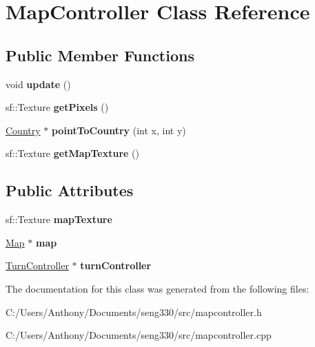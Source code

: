 \hypertarget{class_map_controller}{}\section{Map\+Controller Class Reference}
\label{class_map_controller}
\subsection*{Public Member Functions}
\begin{DoxyCompactItemize}
\item 
\hypertarget{class_map_controller_adced4bd3ec77f9b9be0dfe4d4f808780}{}void {\bfseries update} ()\label{class_map_controller_adced4bd3ec77f9b9be0dfe4d4f808780}

\item 
\hypertarget{class_map_controller_abb8a01b6107a60b4a7f6a37ac742b476}{}sf\+::\+Texture {\bfseries get\+Pixels} ()\label{class_map_controller_abb8a01b6107a60b4a7f6a37ac742b476}

\item 
\hypertarget{class_map_controller_a41e66a786f72c143fb707a9443f7d94e}{}\hyperlink{class_country}{Country} $\ast$ {\bfseries point\+To\+Country} (int x, int y)\label{class_map_controller_a41e66a786f72c143fb707a9443f7d94e}

\item 
\hypertarget{class_map_controller_a78ac4d045098a856b48d61e8e939e5aa}{}sf\+::\+Texture {\bfseries get\+Map\+Texture} ()\label{class_map_controller_a78ac4d045098a856b48d61e8e939e5aa}

\end{DoxyCompactItemize}
\subsection*{Public Attributes}
\begin{DoxyCompactItemize}
\item 
\hypertarget{class_map_controller_a1ae9ff76511baabf2d5c61133b6d5246}{}sf\+::\+Texture {\bfseries map\+Texture}\label{class_map_controller_a1ae9ff76511baabf2d5c61133b6d5246}

\item 
\hypertarget{class_map_controller_a136fc0bac51b7171f3e31505c6b90a34}{}\hyperlink{class_map}{Map} $\ast$ {\bfseries map}\label{class_map_controller_a136fc0bac51b7171f3e31505c6b90a34}

\item 
\hypertarget{class_map_controller_ac32c7f2abafb9c002cf746cf761afc56}{}\hyperlink{class_turn_controller}{Turn\+Controller} $\ast$ {\bfseries turn\+Controller}\label{class_map_controller_ac32c7f2abafb9c002cf746cf761afc56}

\end{DoxyCompactItemize}


The documentation for this class was generated from the following files\+:\begin{DoxyCompactItemize}
\item 
C\+:/\+Users/\+Anthony/\+Documents/seng330/src/mapcontroller.\+h\item 
C\+:/\+Users/\+Anthony/\+Documents/seng330/src/mapcontroller.\+cpp\end{DoxyCompactItemize}
